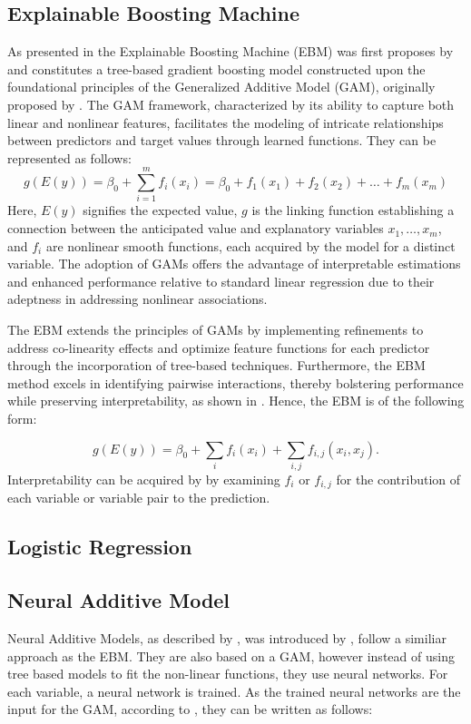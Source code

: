 \documentclass{article}
\begin{document}
\subsection{Explainable Boosting Machine}
As presented in \cite{nazemi2022interpretable} the Explainable Boosting Machine (EBM) was first proposes by \cite{nori2019interpretable} and constitutes a tree-based gradient boosting model constructed upon the foundational principles of the Generalized Additive Model (GAM), originally proposed by \cite{hastie1986generalized}. The GAM framework, characterized by its ability to capture both linear and nonlinear features, facilitates the modeling of intricate relationships between predictors and target values through learned functions. They can be represented as follows:
\begin{equation}
g(E(y)) = \beta_0 + \sum_{i=1}^{m} f_i(x_i) = \beta_0 + f_1(x_1) + f_2(x_2) + \dots + f_m(x_m)
\end{equation}
Here, \(E(y)\) signifies the expected value, \(g\) is the linking function establishing a connection between the anticipated value and explanatory variables \(x_1, \ldots, x_m\), and \(f_i\) are nonlinear smooth functions, each acquired by the model for a distinct variable. The adoption of GAMs offers the advantage of interpretable estimations and enhanced performance relative to standard linear regression due to their adeptness in addressing nonlinear associations. \cite{nazemi2022interpretable}

The EBM extends the principles of GAMs by implementing refinements to address co-linearity effects and optimize feature functions for each predictor through the incorporation of tree-based techniques. Furthermore, the EBM method excels in identifying pairwise interactions, thereby bolstering performance while preserving interpretability, as shown in \cite{lou2013accurate}. Hence, the EBM is of the following form:

\begin{equation}
g(E(y)) = \beta_0 + \sum_{i} f_i(x_i) + \sum_{i, j} f_{i,j}(x_i, x_j).
\end{equation}
Interpretability can be acquired by by examining $f_i$ or $f_{i, j}$ for the contribution of each variable or variable pair to the prediction. \cite{nazemi2022interpretable}
\subsection{Logistic Regression}
\subsection{Neural Additive Model}
Neural Additive Models, as described by \cite{nazemi2022interpretable}, was introduced by \cite{NAM-Library1}, follow a similiar approach as the EBM. They are also based on a GAM, however instead of using tree based models to fit the non-linear functions, they use neural networks. For each variable, a neural network is trained.
As the trained neural networks are the input for the GAM, according to \cite{nazemi2022interpretable}, they can be written as follows:
\end{document}
